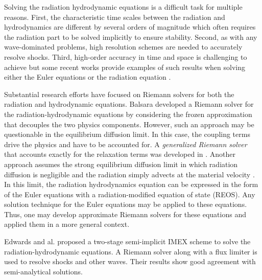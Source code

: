 \documentclass[review]{elsarticle}
\begin{document}
Solving the radiation hydrodynamic equations is a difficult task for multiple reasons. First, the characteristic time scales between the radiation and hydrodynamics are different by several orders of magnitude which often requires the radiation part to be solved implicitly to ensure stability. Second, as with any wave-dominated problems, high resolution schemes are needed to accurately resolve shocks. Third, high-order accuracy in time and space is challenging to achieve but some recent works provide examples of such results when solving either the Euler equations \cite{Hussaini, jlg1, jlg2, Leveque} or the radiation equation \cite{nse_ragusa_wang,jcp_ragusa_wang}. 

Substantial research efforts have focused on Riemann solvers for both the radiation and hydrodynamic equations. Balsara \cite{Balsara} developed a Riemann solver for the radiation-hydrodynamic equations by considering the frozen approximation that decouples the two physics components. However, such an approach may be questionable in the equilibrium diffusion limit. In this case, the coupling terms drive the physics and have to be accounted for. A \emph{generalized Riemann solver} that accounts exactly for the relaxation terms was developed in \cite{Balsara}. Another approach assumes the strong equilibrium diffusion limit in which radiation diffusion is negligible and the radiation simply advects at the material velocity \cite{Woodward}. In this limit, the radiation hydrodynamics equation can be expressed in the form of the Euler equations with a radiation-modified equation of state (REOS). Any solution technique for the Euler equations may be applied to these equations. Thus, one may develop approximate Riemann solvers for these equations and applied them in a more general context. 

Edwards and al. \cite{EdwardsMorelLowrie} proposed a two-stage semi-implicit IMEX scheme to solve the radiation-hydrodynamic equations. A Riemann solver along with a flux limiter is used to resolve shocks and other waves. Their results show good agreement with semi-analytical solutions. 
\end{document}
